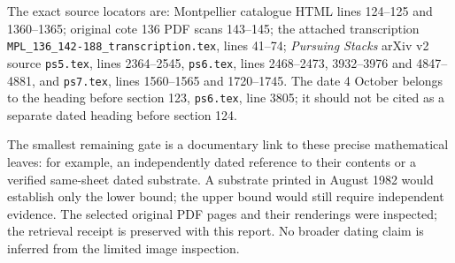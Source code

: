 The exact source locators are: Montpellier catalogue HTML lines
124--125 and 1360--1365; original cote 136 PDF scans 143--145;
the attached transcription
\nolinkurl{MPL_136_142-188_transcription.tex}, lines 41--74;
\emph{Pursuing Stacks} arXiv v2 source
\texttt{ps5.tex}, lines 2364--2545,
\texttt{ps6.tex}, lines 2468--2473, 3932--3976 and 4847--4881,
and \texttt{ps7.tex}, lines 1560--1565 and 1720--1745.
The date 4 October belongs to the heading before section 123,
\texttt{ps6.tex}, line 3805; it should not be cited as a separate
dated heading before section 124.

The smallest remaining gate is a documentary link to these precise
mathematical leaves: for example, an independently dated reference
to their contents or a verified same-sheet dated substrate. A
substrate printed in August 1982 would establish only the lower
bound; the upper bound would still require independent evidence.
The selected original PDF pages and their renderings were inspected;
the retrieval receipt is preserved with this report. No broader dating claim is
inferred from the limited image inspection.

